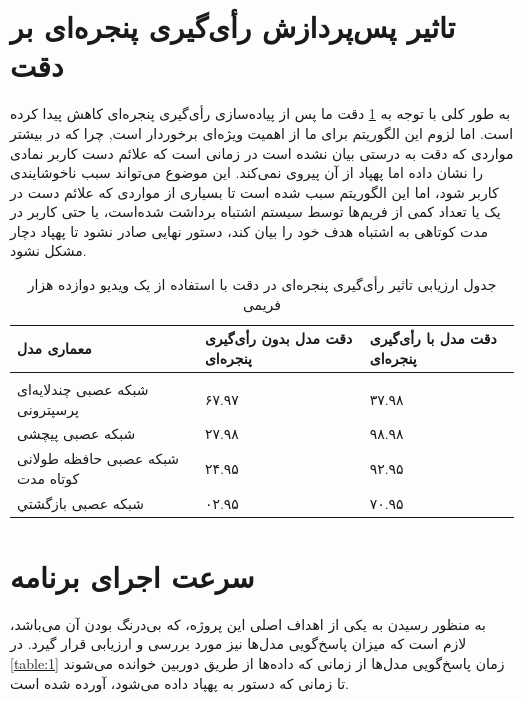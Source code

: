

\section{تاثیر پس‌پردازش رأی‌گیری پنجره‌ای بر دقت}
به طور کلی با توجه به 
\cref{table:window}
 دقت ما پس از پیاده‌سازی رأی‌گیری پنجره‌ای کاهش پیدا کرده است. اما لزوم این الگوریتم برای ما از اهمیت ویژه‌ای برخوردار است, چرا که در بیشتر مواردی که دقت به درستی بیان نشده است در زمانی است که علائم دست کاربر نمادی را نشان داده اما پهپاد از آن پیروی نمی‌کند. این موضوع می‌تواند سبب ناخوشایندی کاربر شود، اما این الگوریتم سبب شده است تا بسیاری از
 مواردی که علائم دست در یک یا تعداد کمی از فریم‌ها توسط سیستم اشتباه برداشت شده‌است، یا حتی کاربر در مدت کوتاهی به اشتباه هدف خود را بیان کند، دستور نهایی صادر نشود تا پهپاد دچار مشکل نشود.

\begin{table}[h!]
    \centering
    \begin{tabular}{||>{\centering\arraybackslash}p{5.5cm} >{\centering\arraybackslash}p{4cm} >{\centering\arraybackslash}p{4cm}||}
     \hline
     \rule{0pt}{3ex} معماری مدل & دقت مدل بدون رأی‌گیری پنجره‌ای & دقت مدل با رأی‌گیری پنجره‌ای \\ [1.5ex]
     \hline
     \hline
     \rule{0pt}{0.5ex} & & \\  
     شبکه عصبی چندلایه‌ای پرسپترونی & ۶۷.۹۷ \text{\%} & ۳۷.۹۸ \text{\%}\\ [2.5ex]
     شبکه عصبی پیچشی & ۲۷.۹۸ \text{\%} & ۹۸.۹۸ \text{\%} \\ [2.5ex]
     شبکه عصبی حافظه طولانی کوتاه مدت & ۲۴.۹۵ \text{\%} & ۹۲.۹۵ \text{\%} \\ [2.5ex]
     شبکه عصبی بازگشتي & ۰۲.۹۵ \text{\%} & ۷۰.۹۵ \text{\%} \\ [2.5ex]
     \hline
    \end{tabular}
    \caption{جدول ارزیابی تاثیر رأی‌گیری پنجره‌ای در دقت  با استفاده از یک ویدیو دوازده هزار فریمی}
    \centering
    \label{table:window}
\end{table}


\section{سرعت اجرای برنامه}
به منظور رسیدن به یکی از اهداف اصلی این پروژه، که بی‌درنگ بودن آن می‌باشد، لازم است که میزان پاسخ‌گویی مدل‌ها نیز مورد بررسی و ارزیابی قرار گیرد. در 
\cref{table:1}
زمان پاسخ‌گویی مدل‌ها از زمانی که داده‌ها از طریق دوربین خوانده می‌شوند تا زمانی که دستور به پهپاد داده می‌شود، آورده شده است.

